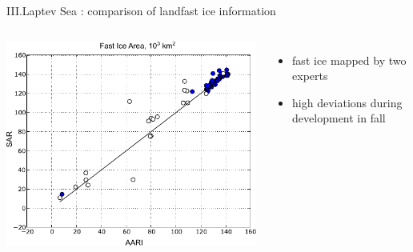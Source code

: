 \documentclass[8pt]{beamer}
\begin{document}
\setwatermark{\fontsize{125pt}{125pt}\selectfont{}}
\begin{frame}[fragile]{III.Laptev Sea : comparison of landfast ice information}
\begin{columns}
	\includegraphics[width=1\textwidth]{./img/SAR_AARI.pdf}
	\begin{itemize}
		\item fast ice mapped by two experts 
		\item high deviations during development in fall
	\end{itemize}
\end{columns}
\end{frame}
\end{document}

